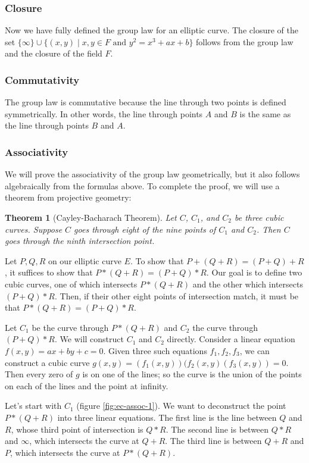 \documentclass{article}
\newtheorem*{theorem}{Theorem}
\begin{document}
\subsubsection{Closure}
Now we have fully defined the group law for an elliptic curve.
The closure of the set $\{\infty\} \cup \{(x,y) \mid x,y \in F \text{ and } y^2 = x^3 + ax + b\}$ follows from the group law and the closure of the field $F$.

\subsubsection{Commutativity}
The group law is commutative because the line through two points is defined symmetrically.
In other words, the line through points $A$ and $B$ is the same as the line through points $B$ and $A$.

\subsubsection{Associativity}
We will prove the associativity of the group law geometrically, but it also follows algebraically from the formulas above.
To complete the proof, we will use a theorem from projective geometry:

\begin{theorem}[Cayley-Bacharach Theorem]
Let $C$, $C_1$, and $C_2$ be three cubic curves.
Suppose $C$ goes through eight of the nine points of $C_1$ and $C_2$.
Then $C$ goes through the ninth intersection point.
\end{theorem}

Let $P,Q,R$ on our elliptic curve $E$.
To show that $P+(Q+R) = (P+Q)+R$, it suffices to show that $P*(Q+R) = (P+Q)*R$.
Our goal is to define two cubic curves, one of which intersects $P*(Q+R)$ and the other which intersects $(P+Q)*R$.
Then, if their other eight points of intersection match, it must be that $P*(Q+R) = (P+Q)*R$.

Let $C_1$ be the curve through $P*(Q+R)$ and $C_2$ the curve through $(P+Q)*R$.
We will construct $C_1$ and $C_2$ directly.
Consider a linear equation $f(x,y) = ax + by + c = 0$.
Given three such equations $f_1, f_2, f_3$, we can construct a cubic curve $g(x,y) = (f_1(x,y))(f_2(x,y)(f_3(x,y)) = 0$.
Then every zero of $g$ is on one of the lines; so the curve is the union of the points on each of the lines and the point at infinity.

Let's start with $C_1$ (figure \ref{fig:ec-assoc-1}).
We want to deconstruct the point $P*(Q+R)$ into three linear equations.
The first line is the line between $Q$ and $R$, whose third point of intersection is $Q*R$.
The second line is between $Q*R$ and $\infty$, which intersects the curve at $Q+R$.
The third line is between $Q+R$ and $P$, which intersects the curve at $P*(Q+R)$.
\end{document}

